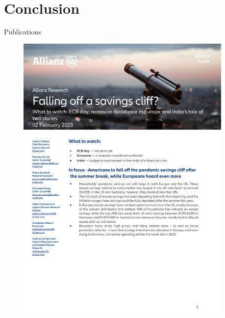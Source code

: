 \documentclass[9pt, xcolor={dvipsnames}]{beamer}
\begin{document}
\section{Conclusion}
\begin{frame}{Publications}
  \begin{figure}
   \begin{columns}[c]
    \begin{column}{0.3\textwidth}
      \centering
      \includegraphics[width=1.3\textwidth]{img/az1.png}
    \end{column}
    \begin{column}{0.3\textwidth}
      \centering

\end{column}
\end{columns}
\end{figure}
\end{frame}
\end{document}
